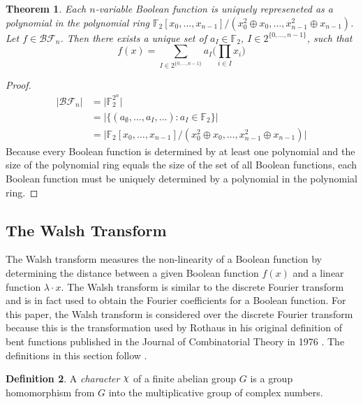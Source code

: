 \documentclass[english]{article}
\def\gftwo{\mathbb{F}_2}
\def\BF{\mathcal{BF}}
\def\Chi{\raisebox{2pt}{$\chi$}}
\theoremstyle{plain}
\newtheorem{theorem}{Theorem}[subsection]
\theoremstyle{definition}
\newtheorem{definition}[theorem]{Definition}%
\theoremstyle{remark}
\begin{document}
\begin{theorem}
Each $n$-variable Boolean function is uniquely represeneted as a polynomial
in the polynomial ring $\gftwo[x_0,\dots,x_{n-1}]/ (x_0^2\oplus x_0,\dots,
x_{n-1}^2 \oplus x_{n-1})$. Let $f\in\BF_n$. Then there exists a unique set
of $a_I\in\gftwo$, $I\in2^{\{0,\dots,n-1\}}$, such that
\begin{equation}\label{eqn:ANF}
  f(x)=\sum_{I\in2^{\{0,\dots,n-1\}}}a_I\bigg(\prod_{i\in I}x_i\bigg)
\end{equation}
\end{theorem}

\begin{proof}
  \begin{align*}
  \lvert\BF_n\rvert
    &= \lvert \gftwo^{2^n} \rvert \\
    &= \lvert \{(a_{\emptyset},\ldots,a_I,\ldots):a_I\in\gftwo\} \rvert \\
    &= \lvert \gftwo[x_0,\dots,x_{n-1}]/ (x_0^2\oplus x_0,\dots,
    x_{n-1}^2 \oplus x_{n-1})\rvert
  \end{align*}
  Because every Boolean function is determined by at least one polynomial
  and the size of the polynomial ring equals the size of the set of all
  Boolean functions, each Boolean function must be uniquely determined by a
  polynomial in the polynomial ring.
\end{proof}

\subsection{The Walsh Transform}
\par The Walsh transform measures the non-linearity of a Boolean function by
determining the distance between a given Boolean function $f(x)$ and a linear
function $\lambda\cdot x$. The Walsh transform is similar to the discrete
Fourier transform and is in fact used to obtain the Fourier coefficients for a
Boolean function. For this paper, the Walsh transform is considered over the
discrete Fourier transform because this is the transformation used by Rothaus
in his original definition of bent functions published in the Journal of
Combinatorial Theory in 1976 \cite{art:r76}. The definitions in this section
follow \cite{bk:lsy11}.

\begin{definition}
  A {\em character} $\Chi$ of a finite abelian group $G$ is a group
  homomorphism from $G$ into the multiplicative group of complex numbers.
\end{definition}
\end{document}
